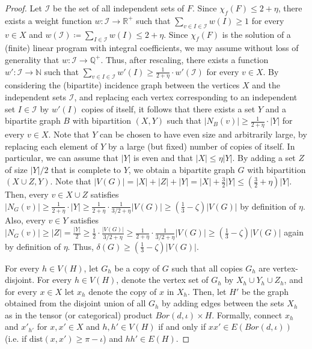 \documentclass[10pt,a4paper]{amsart}
\newcommand{\dist}{\text{dist}}
\begin{document}
\begin{proof}
    Let $\mathcal{I}$ be the set of all independent sets of $F$.
    Since $\chi_f(F) \leq 2 + \eta$, there exists a weight function $w : \mathcal{I} \to \mathbb{R}^+$ such that $\sum_{v \in I \in \mathcal{I}}w(I) \geq 1$ for every $v \in X$ and $w(\mathcal{I}) \coloneqq \sum_{I \in \mathcal{I}}w(I) \leq 2+\eta$.
    Since $\chi_f(F)$ is the solution of a (finite) linear program with integral coefficients, we may assume without loss of generality that $w : \mathcal{I} \to \mathbb{Q}^+$.
    Thus, after rescaling, there exists a function $w' : \mathcal{I} \to \mathbb{N}$ such that $\sum_{v \in I \in \mathcal{I}}w'(I) \geq \frac{1}{2+\eta} \cdot w'(\mathcal{I})$ for every $v \in X$.
    By considering the (bipartite) incidence graph between the vertices $X$ and the independent sets $\mathcal{I}$, and replacing each vertex corresponding to an independent set $I \in \mathcal{I}$ by $w'(I)$ copies of itself, it follows that there exists a set $Y$ and a bipartite graph $B$ with bipartition $(X, Y)$ such that $|N_B(v)| \geq \frac{1}{2+\eta} \cdot |Y|$ for every $v \in X$.
    Note that $Y$ can be chosen to have even size and arbitrarily large, by replacing each element of $Y$ by a large (but fixed) number of copies of itself.
    In particular, we can assume that $|Y|$ is even and that $|X| \leq \eta|Y|$.
    By adding a set $Z$ of size $|Y|/2$ that is complete to $Y$, we obtain a bipartite graph $G$ with bipartition $(X \cup Z, Y)$.
    Note that $|V(G)| = |X| + |Z| + |Y| = |X| + \frac{3}{2}|Y| \leq \left(\frac{3}{2} + \eta\right)|Y|$.
    Then, every $v \in X \cup Z$ satisfies $|N_{G}(v)| \geq \frac{1}{2+\eta} \cdot |Y| \geq \frac{1}{2 + \eta} \cdot \frac{1}{3/2 + \eta}|V(G)| \geq  \left(\frac{1}{3} - \zeta\right)|V(G)|$ by definition of $\eta$.
    Also, every $v \in Y$ satisfies $|N_{G}(v)| \geq |Z| = \frac{|Y|}{2} \geq \frac{1}{2} \cdot \frac{|V(G)|}{3/2 + \eta} \geq \frac{1}{2 + \eta} \cdot \frac{1}{3/2 + \eta}|V(G)| \geq \left(\frac{1}{3} - \zeta\right)|V(G)|$ again by definition of $\eta$.
    Thus, $\delta(G) \geq \left(\frac{1}{3} - \zeta\right)|V(G)|$.

    For every $h \in V(H)$, let $G_h$ be a copy of $G$ such that all copies $G_h$ are vertex-disjoint.
    For every $h \in V(H)$, denote the vertex set of $G_h$ by $X_h \cup Y_h \cup Z_h$, and for every $x \in X$ let $x_h$ denote the copy of $x$ in $X_h$.
    Then, let $H'$ be the graph obtained from the disjoint union of all $G_h$ by adding edges between the sets $X_h$ as in the tensor (or categorical) product $Bor(d, \iota) \times H$.
    Formally, connect $x_h$ and $x'_{h'}$ for $x, x' \in X$ and $h, h' \in V(H)$ if and only if $xx' \in E(Bor(d, \iota))$ (i.e. if $\dist(x, x') \geq \pi - \iota$) and $hh' \in E(H)$.


\end{proof}
\end{document}
